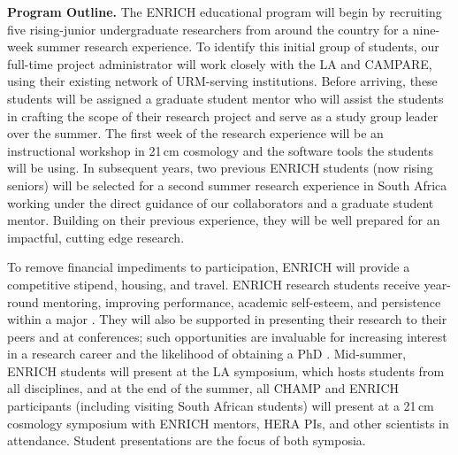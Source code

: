 \documentclass[preprint,11pt]{aastex}
\begin{document}
\textbf{Program Outline.} The ENRICH educational program will begin by recruiting five rising-junior undergraduate researchers from around the country for a nine-week summer research experience.  To identify this initial group of students, our full-time project administrator will work closely with the LA and CAMPARE, using their existing network of URM-serving institutions.  Before arriving, these students will be assigned a graduate student mentor who will assist the students in crafting the scope of their research project and serve as a study group leader over the summer.  The first week of the research experience will be an instructional workshop in 21\,cm cosmology and the software tools the students will be using.  In subsequent years, two previous ENRICH students (now rising seniors) will be selected for a second summer research experience in South Africa working under the direct guidance of our collaborators and a graduate student mentor.  Building on their previous experience,
they will be well prepared for an impactful, cutting edge research.

To remove financial impediments to participation, ENRICH will provide a competitive stipend, housing, and travel.  
ENRICH research students receive year-round mentoring, 
improving performance, academic self-esteem, and persistence within a major \citep{cross_and_vick_2001,armstrong_and_thompson_2003}. They will also be supported in presenting their research to their peers and at conferences; such opportunities are invaluable for increasing interest in a research career and the likelihood of obtaining a PhD \citep{nsf_report_2006}.
Mid-summer,  ENRICH students will present 
at the LA symposium, which hosts students from all disciplines, and  at the end of the summer, all CHAMP and ENRICH participants (including visiting South African students) will present 
at a 21\,cm cosmology symposium with ENRICH mentors, HERA PIs, and other scientists in attendance.  Student presentations are the focus of both symposia.
\end{document}
